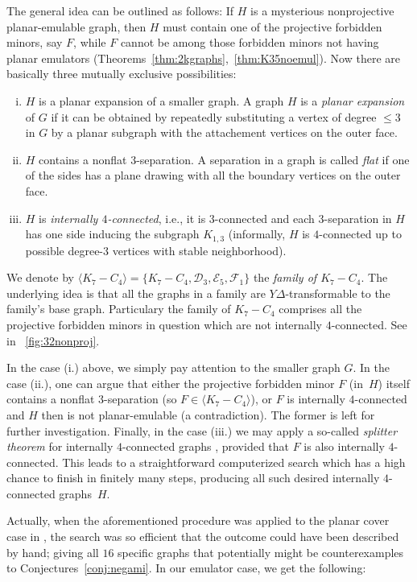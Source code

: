 \documentclass[envcountsect,envcountsame]{llncs}
\newcommand{\KK}{\ensuremath{{K}_7 - C_4}\xspace}
\newcommand{\DD}{\ensuremath{\mathcal{D}_3}\xspace}
\newcommand{\EEE}{\ensuremath{\mathcal{E}_5}\xspace}
\newcommand{\FF}{\ensuremath{\mathcal{F}_1}\xspace}
\begin{document}
The general idea can be outlined as follows:
If $H$ is a mysterious nonprojective planar-emulable graph,
then $H$ must contain one of the projective forbidden minors, say $F$,
while $F$ cannot be among those forbidden minors not having planar emulators
(Theorems~\ref{thm:2kgraphs},~\ref{thm:K35noemul}).
Now there are basically three mutually exclusive possibilities:
\begin{enumerate}[i.]\vspace{-3pt}
\item
$H$ is a planar expansion of a smaller graph.
A graph $H$ is a \emph{planar expansion} of $G$ if it can be obtained by
repeatedly substituting a vertex of degree $\leq3$ in $G$ 
by a planar subgraph with the attachement vertices on the outer face. 
\item
$H$ contains a nonflat $3$-separation.
A separation in a graph is called {\em flat} if one of the sides
has a plane drawing with all the boundary vertices on the outer face.
\item
$H$ is {\em internally $4$-connected}, i.e.,
it is $3$-connected and each $3$-separation in $H$ has one side inducing the
subgraph $K_{1,3}$
(informally, $H$ is $4$-connected up to possible degree-$3$ vertices
with stable neighborhood).
\end{enumerate}

We denote by
$\langle K_7-C_4 \rangle=\{\KK,\DD, \EEE, \FF\}$
the {\em family of $K_7-C_4$}.
The underlying idea is that all the graphs in a family
are $Y\!\Delta$-transformable to the family's base graph.
Particulary the family of $K_7-C_4$ comprises all the projective
forbidden minors in question which are not internally $4$-connected.
See in \figurename~\ref{fig:32nonproj}.

In the case (i.) above, we simply pay attention to the smaller graph $G$.
In the case (ii.), one can argue that either the projective forbidden minor
$F$ (in~$H$) itself contains a nonflat $3$-separation (so
$F\in\langle K_7-C_4 \rangle$),
or $F$ is internally $4$-connected and $H$ then is not planar-emulable 
(a contradiction).
The former is left for further investigation.
Finally, in the case (iii.) we may apply a so-called {\em splitter theorem}
for internally $4$-connected graphs \cite{cit:splitter},
provided that $F$ is also internally $4$-connected.
This leads to a straightforward computerized search which has a
high chance to finish in finitely many steps,
producing all such desired internally $4$-connected graphs~$H$.

Actually, when the aforementioned procedure was applied to the planar cover
case in \cite{cit:counterex}, the search was so efficient that the outcome
could have been described by hand; giving all $16$ specific graphs that
potentially might be counterexamples to Conjectures~\ref{conj:negami}.
In our emulator case, we get the following:
\end{document}
